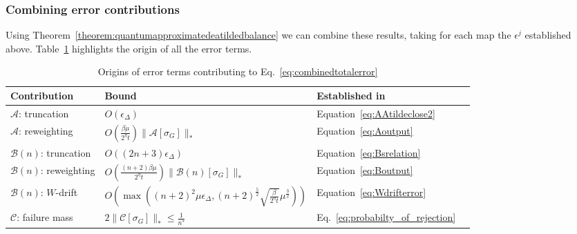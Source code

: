 \documentclass[aps,floatfix,10pt,amssymb,amsfont,amsmath,superscriptaddress,float,nofootinbib,longbibliography,nobalancelastpage,twocolumn]{revtex4-2}
\begin{document}
\subsubsection{Combining error contributions}
Using Theorem~\ref{theorem:quantumapproximatedeatildedbalance} we can combine these results, taking for each map the $\epsilon^j$ established above. Table~\ref{tab:contributions} highlights the origin of all the error terms.
\begin{table}
\begin{tabular}{llll}
\hline\hline
Contribution & Bound & Established in \\
\hline
$\mathcal{A}$: truncation & $O(\epsilon_{\Delta})$ &
Equation~\eqref{eq:AAtildeclose2} \\
$\mathcal{A}$: reweighting &  $O(\frac{\beta\mu}{2^{\eta}t})\|\mathcal{A}[\sigma_G]\|_*$ & Equation~\eqref{eq:Aoutput} \\
$\mathcal{B}(n)$: truncation  & $O((2n+3)\epsilon_{\Delta})$ & Equation~\eqref{eq:Bsrelation} \\
$\mathcal{B}(n)$: reweighting & $O(\frac{(n+2)\beta\mu}{2^{\eta}t})\|\mathcal{B}(n)[\sigma_G]\|_*$ &  Equation~\eqref{eq:Boutput}\\
$\mathcal{B}(n)$: $W$-drift  & $O\left(\max\left((n+2)^2\mu\epsilon_{\Delta},(n+2)^{\frac{5}{2}}\sqrt{\frac{\beta }{2^{\eta}t}}\mu^{\frac{3}{2}}\right)\right) $ & Equation~\eqref{eq:Wdrifterror}\\
$\mathcal{C}$: failure mass & $2\|\mathcal{C}[\sigma_G]\|_* \leq \frac{1}{n^*}$ &  Eq.~\eqref{eq:probabilty_of_rejection} \\
\hline\hline
\end{tabular}
\caption{\label{tab:contributions} Origins of error terms contributing to Eq.~\eqref{eq:combinedtotalerror}}
\end{table}
\end{document}
